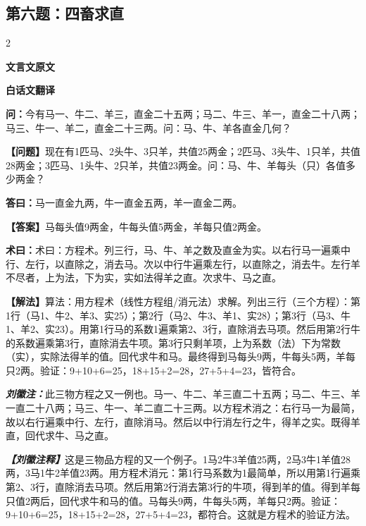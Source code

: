 \documentclass[10pt,a4paper]{article}
\newcommand{\wen}[1]{\textbf{\color{problemcolor}问：}#1\par}
\newcommand{\da}[1]{\textbf{答曰：}#1\par}
\newcommand{\shu}[1]{\textbf{术曰：}#1\par}
\newcommand{\liuhui}[1]{{\color{commentarycolor}\textit{\textbf{刘徽注：}}#1\par}}
\newcommand{\classicalheader}[1]{{\centering\large\bfseries\color{classicalcolor} #1\par\vspace{0.5em}}}
\newcommand{\wenmodern}[1]{\textbf{\color{moderncolor}【问题】}#1\par}
\newcommand{\damodern}[1]{\textbf{【答案】}#1\par}
\newcommand{\shumodern}[1]{\textbf{【解法】}#1\par}
\newcommand{\liuhuimodern}[1]{{\color{commentarycolor}\textit{\textbf{【刘徽注释】}}#1\par}}
\newcommand{\modernheader}[1]{{\centering\large\bfseries\color{moderncolor} #1\par\vspace{0.5em}}}
\newcommand{\problemsec}[1]{\subsection*{#1}}
\begin{document}
\problemsec{第六题：四畜求直}
\begin{paracol}{2}
\classicalheader{文言文原文}
\switchcolumn
\modernheader{白话文翻译}
\switchcolumn*

\wen{今有马一、牛二、羊三，直金二十五两；马二、牛三、羊一，直金二十八两；马三、牛一、羊二，直金二十三两。问：马、牛、羊各直金几何？}

\switchcolumn

\wenmodern{现在有1匹马、2头牛、3只羊，共值25两金；2匹马、3头牛、1只羊，共值28两金；3匹马、1头牛、2只羊，共值23两金。问：马、牛、羊每头（只）各值多少两金？}

\switchcolumn*

\da{马一直金九两，牛一直金五两，羊一直金二两。}

\switchcolumn

\damodern{马每头值9两金，牛每头值5两金，羊每只值2两金。}

\switchcolumn*

\shu{术曰：方程术。列三行，马、牛、羊之数及直金为实。以右行马一遍乘中行、左行，以直除之，消去马。次以中行牛遍乘左行，以直除之，消去牛。左行羊不尽者，上为法，下为实，实如法得羊之直。次求牛、马之直。}

\switchcolumn

\shumodern{算法：用方程术（线性方程组/消元法）求解。列出三行（三个方程）：第1行（马1、牛2、羊3、实25）；第2行（马2、牛3、羊1、实28）；第3行（马3、牛1、羊2、实23）。用第1行马的系数1遍乘第2、3行，直除消去马项。然后用第2行牛的系数遍乘第3行，直除消去牛项。第3行只剩羊项，上为系数（法）下为常数（实），实除法得羊的值。回代求牛和马。最终得到马每头9两，牛每头5两，羊每只2两。验证：9+10+6=25，18+15+2=28，27+5+4=23，皆符合。}

\switchcolumn*

\liuhui{此三物方程之又一例也。马一、牛二、羊三直二十五两；马二、牛三、羊一直二十八两；马三、牛一、羊二直二十三两。以方程术消之：右行马一为最简，故以右行遍乘中行、左行，直除消马。然后以中行消左行之牛，得羊之实。既得羊直，回代求牛、马之直。}

\switchcolumn

\liuhuimodern{这是三物品方程的又一个例子。1马2牛3羊值25两，2马3牛1羊值28两，3马1牛2羊值23两。用方程术消元：第1行马系数为1最简单，所以用第1行遍乘第2、3行，直除消去马项。然后用第2行消去第3行的牛项，得到羊的值。得到羊每只值2两后，回代求牛和马的值。马每头9两，牛每头5两，羊每只2两。验证：9+10+6=25，18+15+2=28，27+5+4=23，都符合。这就是方程术的验证方法。}

\end{paracol}
\end{document}
